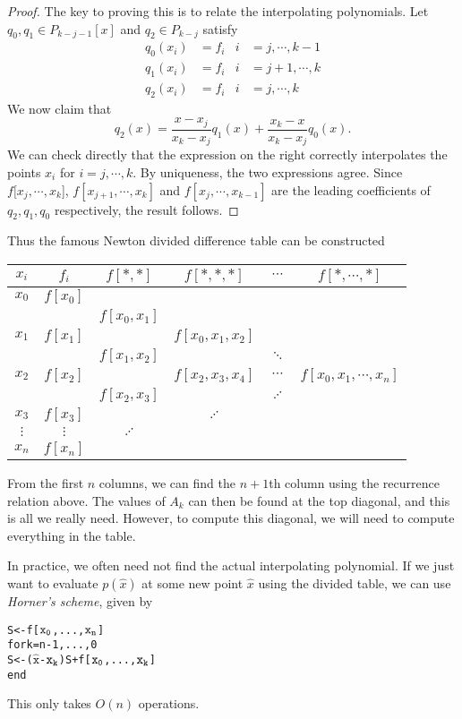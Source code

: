 \documentclass[a4paper]{article}
\begin{document}
\begin{proof}
  The key to proving this is to relate the interpolating polynomials. Let $q_0, q_1 \in P_{k - j - 1}[x]$ and $q_2 \in P_{k - j}$ satisfy
  \begin{align*}
    q_0(x_i) &= f_i & i &=j, \cdots, k - 1\\
    q_1(x_i) &= f_i & i &=j + 1, \cdots, k\\
    q_2(x_i) &= f_i & i &=j, \cdots, k
  \end{align*}
  We now claim that
  \[
    q_2(x) = \frac{x - x_j}{x_k - x_j} q_1(x) + \frac{x_k - x}{x_k - x_j} q_0(x).
  \]
  We can check directly that the expression on the right correctly interpolates the points $x_i$ for $i = j, \cdots, k$. By uniqueness, the two expressions agree. Since $f[x_j, \cdots, x_k$], $f[x_{j + 1}, \cdots, x_k]$ and $f[x_j, \cdots, x_{k - 1}]$ are the leading coefficients of $q_2, q_1, q_0$ respectively, the result follows.
\end{proof}
Thus the famous Newton divided difference table can be constructed
\begin{center}
  \begin{tabular}{cccccc}
    \toprule
    $x_i$ & $f_i$ & $f[*, *]$ & $f[*, *, *]$ & $\cdots$ & $f[*, \cdots,*]$\\
    \midrule
    $x_0$ & $f[x_0]$\\
    & & $f[x_0, x_1]$\\
    $x_1$ & $f[x_1]$ & & $f[x_0, x_1, x_2]$ \\
    & & $f[x_1, x_2]$ & & $\ddots$\\
    $x_2$ & $f[x_2]$ & & $f[x_2, x_3, x_4]$ & $\cdots$ & $f[x_0, x_1, \cdots, x_n]$\\
    & & $f[x_2, x_3]$ & & $\iddots$\\
    $x_3$ & $f[x_3]$ & & $\iddots$\\
    $\vdots$ & $\vdots$ & $\iddots$ &\\
    $x_n$ & $f[x_n]$\\
    \bottomrule
  \end{tabular}
\end{center} %
From the first $n$ columns, we can find the $n + 1$th column using the recurrence relation above. The values of $A_k$ can then be found at the top diagonal, and this is all we really need. However, to compute this diagonal, we will need to compute everything in the table.

In practice, we often need not find the actual interpolating polynomial. If we just want to evaluate $p(\hat{x})$ at some new point $\hat{x}$ using the divided table, we can use \emph{Horner's scheme}, given by
\begin{alltt}
  S <- f[\(\mathtt{x\sb{0}}\),..., \(\mathtt{x\sb{n}}\)]
  for k = n - 1,..., 0
      S <- (\(\mathtt{\hat{x}}\) - \(\mathtt{x\sb{k}}\))S + f[\(\mathtt{x\sb{0}}\),..., \(\mathtt{x\sb{k}}\)]
  end\end{alltt}
This only takes $O(n)$ operations.
\end{document}
